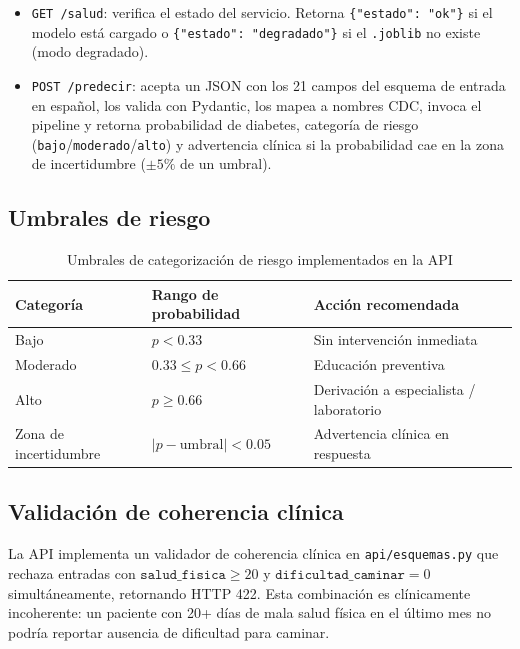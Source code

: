 \documentclass[12pt,a4paper]{article}
\begin{document}
\begin{itemize}
  \item \texttt{GET /salud}: verifica el estado del servicio. Retorna \texttt{\{"estado": "ok"\}} si el modelo está cargado o \texttt{\{"estado": "degradado"\}} si el \texttt{.joblib} no existe (modo degradado).
  \item \texttt{POST /predecir}: acepta un JSON con los 21 campos del esquema de entrada en español, los valida con Pydantic, los mapea a nombres CDC, invoca el pipeline y retorna probabilidad de diabetes, categoría de riesgo (\texttt{bajo}/\texttt{moderado}/\texttt{alto}) y advertencia clínica si la probabilidad cae en la zona de incertidumbre ($\pm 5\%$ de un umbral).
\end{itemize}

\subsection{Umbrales de riesgo}

\begin{table}[H]
  \centering
  \caption{Umbrales de categorización de riesgo implementados en la API}
  \begin{tabular}{lll}
    \toprule
    \textbf{Categoría} & \textbf{Rango de probabilidad} & \textbf{Acción recomendada}\\
    \midrule
    Bajo & $p < 0.33$ & Sin intervención inmediata\\
    Moderado & $0.33 \leq p < 0.66$ & Educación preventiva\\
    Alto & $p \geq 0.66$ & Derivación a especialista / laboratorio\\
    Zona de incertidumbre & $|p - \text{umbral}| < 0.05$ & Advertencia clínica en respuesta\\
    \bottomrule
  \end{tabular}
\end{table}

\subsection{Validación de coherencia clínica}

La API implementa un validador de coherencia clínica en \texttt{api/esquemas.py} que rechaza entradas con $\texttt{salud\_fisica} \geq 20$ y $\texttt{dificultad\_caminar} = 0$ simultáneamente, retornando HTTP 422. Esta combinación es clínicamente incoherente: un paciente con 20+ días de mala salud física en el último mes no podría reportar ausencia de dificultad para caminar.
\end{document}
